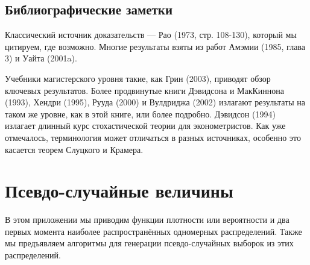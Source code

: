 \section{Библиографические заметки}

Классический источник доказательств --- Рао (1973, стр. 108-130), который мы цитируем, где возможно. Многие результаты взяты из работ Амэмии (1985, глава 3) и Уайта (2001a).

Учебники магистерского уровня такие, как Грин (2003), приводят обзор ключевых результатов. Более продвинутые книги Дэвидсона и МакКиннона (1993), Хендри (1995), Рууда (2000) и Вулдриджа (2002) излагают результаты на таком же уровне, как в этой книге, или более подробно. Дэвидсон (1994) излагает длинный курс стохастической теории для эконометристов. Как уже отмечалось, терминология может отличаться в разных источниках, особенно это касается теорем Слуцкого и Крамера.


\chapter{Псевдо-случайные величины}

В этом приложении мы приводим функции плотности или вероятности и два первых момента наиболее распространённых одномерных распределений. Также мы предъявляем алгоритмы для генерации псевдо-случайных выборок из этих распределений.

